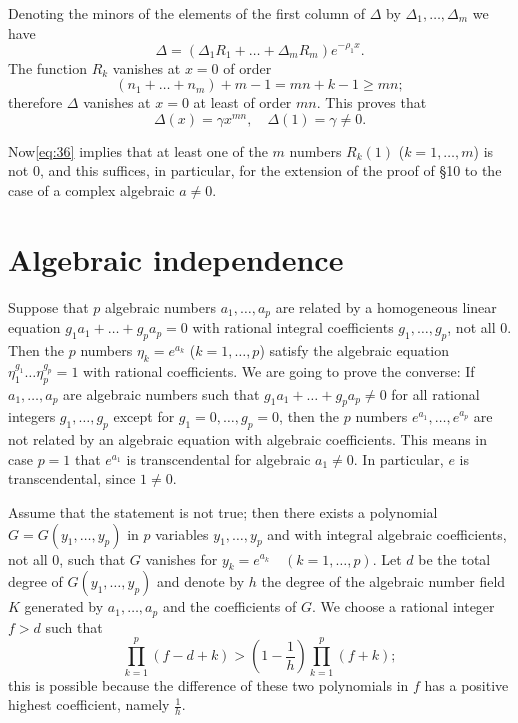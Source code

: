 Denoting the minors of the elements of the first column of $\Delta$ by $\Delta_1, \dots, \Delta_m$ we have
\begin{equation} \Delta = (\Delta_1 R_1 + \dots + \Delta_m R_m) e^{-\rho_1 x}. \tag{36}\label{eq:36} \end{equation}
The function $R_k$ vanishes at $x=0$ of order
\[ (n_1 + \dots + n_m) + m-1 = mn + k-1 \geq mn; \]
therefore $\Delta$ vanishes at $x=0$ at least of order $mn$. This proves that
\[ \Delta(x) = \gamma x^{mn}, \quad \Delta(1) = \gamma \neq 0. \]

Now\eqref{eq:36} implies that at least one of the $m$ numbers $R_k(1)$ ($k=1,\dots,m$) is not 0, and this suffices, in particular, for the extension of the proof of \S 10 to the case of a complex algebraic $a \neq 0$.

\section{Algebraic independence}

Suppose that $p$ algebraic numbers $a_1, \dots, a_p$ are related by a homogeneous linear equation $g_1 a_1 + \dots + g_p a_p = 0$ with rational integral coefficients $g_1, \dots, g_p$, not all 0. Then the $p$ numbers $\eta_k = e^{a_k}$ ($k=1,\dots,p$) satisfy the algebraic equation $\eta_1^{g_1} \dots \eta_p^{g_p} = 1$ with rational coefficients. We are going to prove the converse: If $a_1, \dots, a_p$ are algebraic numbers such that $g_1 a_1 + \dots + g_p a_p \neq 0$ for all rational integers $g_1, \dots, g_p$ except for $g_1=0, \dots, g_p=0$, then the $p$ numbers $e^{a_1}, \dots, e^{a_p}$ are not related by an algebraic equation with algebraic coefficients. This means in case $p=1$ that $e^{a_1}$ is transcendental for algebraic $a_1 \neq 0$. In particular, $e$ is transcendental, since $1 \neq 0$.

Assume that the statement is not true; then there exists a polynomial $G = G(y_1, \dots, y_p)$ in $p$ variables $y_1, \dots, y_p$ and with integral algebraic coefficients, not all 0, such that $G$ vanishes for $y_k = e^{a_k} \quad (k=1,\dots,p)$. Let $d$ be the total degree of $G(y_1, \dots, y_p)$ and denote by $h$ the degree of the algebraic number field $K$ generated by $a_1, \dots, a_p$ and the coefficients of $G$. We choose a rational integer $f > d$ such that
\begin{equation} \prod_{k=1}^{p} (f-d+k) > \left(1-\frac{1}{h}\right) \prod_{k=1}^{p} (f+k); \tag{37}\label{eq:37} \end{equation}
this is possible because the difference of these two polynomials in $f$ has a positive highest coefficient, namely $\frac{1}{h}$.

